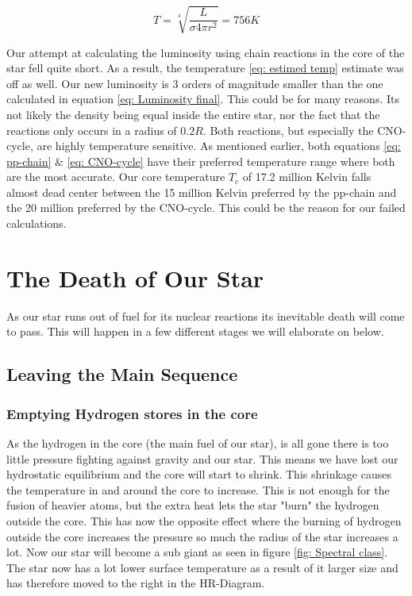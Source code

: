 \documentclass[reprint,english,notitlepage]{revtex4-2}
\begin{document}
\begin{equation}\label{eq: estimed temp}
  T = \sqrt[4]{\frac{L}{σ4πr^{2}} } = 756 K 
\end{equation}

Our attempt at calculating the luminosity using chain reactions in the core of the star fell quite short. As a result, the temperature \ref{eq: estimed temp} estimate was off as well. Our new luminosity is 3 orders of magnitude smaller than the one calculated in equation \ref{eq: Luminosity final}. This could be for many reasons. Its not likely the density being equal inside the entire star, nor the fact that the reactions only occurs in a radius of $ 0.2R $. Both reactions, but especially the CNO-cycle, are highly temperature sensitive. As mentioned earlier, both equations \ref{eq: pp-chain} \& \ref{eq: CNO-cycle} have their preferred temperature range where both are the most accurate. Our core temperature $ T_c $ of 17.2 million Kelvin falls almost dead center between the 15 million Kelvin preferred by the pp-chain and the 20 million preferred by the CNO-cycle. This could be the reason for our failed calculations. 


\section{The Death of Our Star}
As our star runs out of fuel for its nuclear reactions its inevitable death will come to pass. This will happen in a few different stages we will elaborate on below. 

\subsection{Leaving the Main Sequence}

\subsubsection*{Emptying Hydrogen stores in the core}
As the hydrogen in the core (the main fuel of our star), is all gone there is too little pressure fighting against gravity and our star. This means we have lost our hydrostatic equilibrium and the core will start to shrink. This shrinkage causes the temperature in and around the core to increase. This is not enough for the fusion of heavier atoms, but the extra heat lets the star "burn" the hydrogen outside the core. This has now the opposite effect where the burning of hydrogen outside the core increases the pressure so much the radius of the star increases a lot. Now our star will become a sub giant as seen in figure \ref{fig: Spectral class}. The star now has a lot lower surface temperature as a result of it larger size and has therefore moved to the right in the HR-Diagram. 
\end{document}
